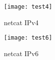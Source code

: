 \begin{itemize}
\begin{figure}[h]                       %
\begin{center}                          %
\texttt{[image: test4]}%
%
\caption[netcat IPv4]{netcat IPv4}\label{fig:test4}
\end{center}
\end{figure}
\begin{figure}[h]                       %
\begin{center}                          %
\texttt{[image: test6]}%
%
\caption[netcat IPv6]{netcat IPv6}\label{fig:test6}
\end{center}

\end{figure}
\end{itemize}

\clearpage{\pagestyle{empty}\cleardoublepage}
